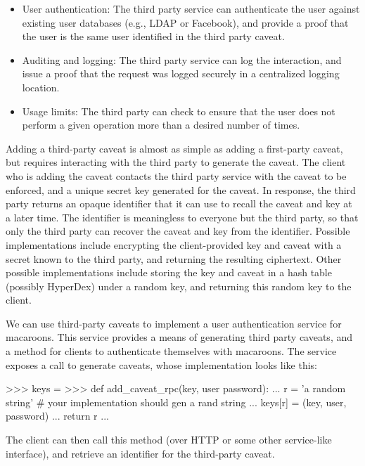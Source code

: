 \begin{itemize}
    \item User authentication:  The third party service can authenticate the
        user against existing user databases (e.g., LDAP or Facebook), and
        provide a proof that the user is the same user identified in the third
        party caveat.
    \item Auditing and logging:  The third party service can log the
        interaction, and issue a proof that the request was logged securely in a
        centralized logging location.
    \item Usage limits: The third party can check to ensure that the user
        does not perform a given operation more than a desired number of
        times.
\end{itemize}

Adding a third-party caveat is almost as simple as adding a first-party caveat,
but requires interacting with the third party to generate the caveat.  The
client who is adding the caveat contacts the third party service with the caveat
to be enforced, and a unique secret key generated for the caveat.  In response,
the third party returns an opaque identifier that it can use to recall the
caveat and key at a later time.  The identifier is meaningless to everyone but
the third party, so that only the third party can recover the caveat and key
from the identifier.  Possible implementations include encrypting the
client-provided key and caveat with a secret known to the third party, and
returning the resulting ciphertext.  Other possible implementations include
storing the key and caveat in a hash table (possibly HyperDex) under a random
key, and returning this random key to the client.

We can use third-party caveats to implement a user authentication service for
macaroons.  This service provides a means of generating third party caveats, and
a method for clients to authenticate themselves with macaroons.  The service
exposes a call to generate caveats, whose implementation looks like this:

\begin{pythoncode}
>>> keys = {}
>>> def add_caveat_rpc(key, user password):
...     r = 'a random string' # your implementation should gen a rand string
...     keys[r] = (key, user, password)
...     return r
...
\end{pythoncode}

The client can then call this method (over HTTP or some other service-like
interface), and retrieve an identifier for the third-party caveat.

